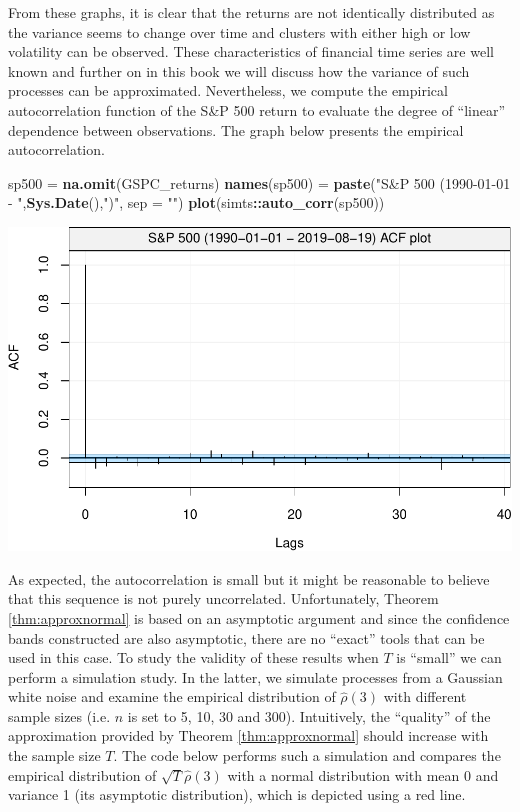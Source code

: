 \documentclass[]{book}
\newenvironment{Shaded}{\begin{snugshade}}{\end{snugshade}}
\newcommand{\KeywordTok}[1]{\textcolor[rgb]{0.13,0.29,0.53}{\textbf{#1}}}
\newcommand{\DataTypeTok}[1]{\textcolor[rgb]{0.13,0.29,0.53}{#1}}
\newcommand{\StringTok}[1]{\textcolor[rgb]{0.31,0.60,0.02}{#1}}
\newcommand{\OperatorTok}[1]{\textcolor[rgb]{0.81,0.36,0.00}{\textbf{#1}}}
\newcommand{\NormalTok}[1]{#1}
\theoremstyle{definition}
\theoremstyle{definition}
\theoremstyle{definition}
\theoremstyle{remark}
\begin{document}
From these graphs, it is clear that the returns are not identically
distributed as the variance seems to change over time and clusters with
either high or low volatility can be observed. These characteristics of
financial time series are well known and further on in this book we will
discuss how the variance of such processes can be approximated.
Nevertheless, we compute the empirical autocorrelation function of the
S\&P 500 return to evaluate the degree of ``linear'' dependence between
observations. The graph below presents the empirical autocorrelation.

\begin{Shaded}
\begin{Highlighting}[]
\NormalTok{sp500 =}\StringTok{ }\KeywordTok{na.omit}\NormalTok{(GSPC_returns)}
\KeywordTok{names}\NormalTok{(sp500) =}\StringTok{ }\KeywordTok{paste}\NormalTok{(}\StringTok{"S&P 500 (1990-01-01 - "}\NormalTok{,}\KeywordTok{Sys.Date}\NormalTok{(),}\StringTok{")"}\NormalTok{, }\DataTypeTok{sep =} \StringTok{""}\NormalTok{)}
\KeywordTok{plot}\NormalTok{(simts}\OperatorTok{::}\KeywordTok{auto_corr}\NormalTok{(sp500))}
\end{Highlighting}
\end{Shaded}

\includegraphics{ts_files/figure-latex/GSPCacf-1.pdf}

As expected, the autocorrelation is small but it might be reasonable to
believe that this sequence is not purely uncorrelated. Unfortunately,
Theorem \ref{thm:approxnormal} is based on an asymptotic argument and
since the confidence bands constructed are also asymptotic, there are no
``exact'' tools that can be used in this case. To study the validity of
these results when \(T\) is ``small'' we can perform a simulation study.
In the latter, we simulate processes from a Gaussian white noise and
examine the empirical distribution of \(\hat{\rho}(3)\) with different
sample sizes (i.e. \(n\) is set to 5, 10, 30 and 300). Intuitively, the
``quality'' of the approximation provided by Theorem
\ref{thm:approxnormal} should increase with the sample size \(T\). The
code below performs such a simulation and compares the empirical
distribution of \(\sqrt{T} \hat{\rho}(3)\) with a normal distribution
with mean 0 and variance 1 (its asymptotic distribution), which is
depicted using a red line.
\end{document}
